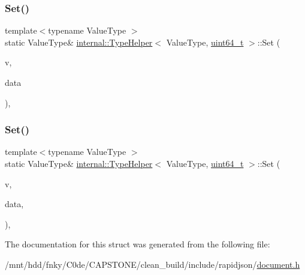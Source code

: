 \mbox{\label{structinternal_1_1TypeHelper_3_01ValueType_00_01uint64__t_01_4_a38392035fe5a647078b24f0e15a84145}} 
\subsubsection{\texorpdfstring{Set()}{Set()}\hspace{0.1cm}{\footnotesize\ttfamily [1/2]}}
{\footnotesize\ttfamily template$<$typename Value\+Type $>$ \\
static Value\+Type\& \hyperlink{structinternal_1_1TypeHelper}{internal\+::\+Type\+Helper}$<$ Value\+Type, \hyperlink{stdint_8h_aec6fcb673ff035718c238c8c9d544c47}{uint64\+\_\+t} $>$\+::Set (\begin{DoxyParamCaption}\item[{Value\+Type \&}]{v,  }\item[{\hyperlink{stdint_8h_aec6fcb673ff035718c238c8c9d544c47}{uint64\+\_\+t}}]{data }\end{DoxyParamCaption})\hspace{0.3cm}{\ttfamily [inline]}, {\ttfamily [static]}}

\mbox{\label{structinternal_1_1TypeHelper_3_01ValueType_00_01uint64__t_01_4_a3c8b01c3e9a9e63c99bef2db9fdf3823}} 
\subsubsection{\texorpdfstring{Set()}{Set()}\hspace{0.1cm}{\footnotesize\ttfamily [2/2]}}
{\footnotesize\ttfamily template$<$typename Value\+Type $>$ \\
static Value\+Type\& \hyperlink{structinternal_1_1TypeHelper}{internal\+::\+Type\+Helper}$<$ Value\+Type, \hyperlink{stdint_8h_aec6fcb673ff035718c238c8c9d544c47}{uint64\+\_\+t} $>$\+::Set (\begin{DoxyParamCaption}\item[{Value\+Type \&}]{v,  }\item[{\hyperlink{stdint_8h_aec6fcb673ff035718c238c8c9d544c47}{uint64\+\_\+t}}]{data,  }\item[{typename Value\+Type\+::\+Allocator\+Type \&}]{ }\end{DoxyParamCaption})\hspace{0.3cm}{\ttfamily [inline]}, {\ttfamily [static]}}



The documentation for this struct was generated from the following file\+:\begin{DoxyCompactItemize}
\item 
/mnt/hdd/fnky/\+C0de/\+C\+A\+P\+S\+T\+O\+N\+E/clean\+\_\+build/include/rapidjson/\hyperlink{document_8h}{document.\+h}\end{DoxyCompactItemize}
